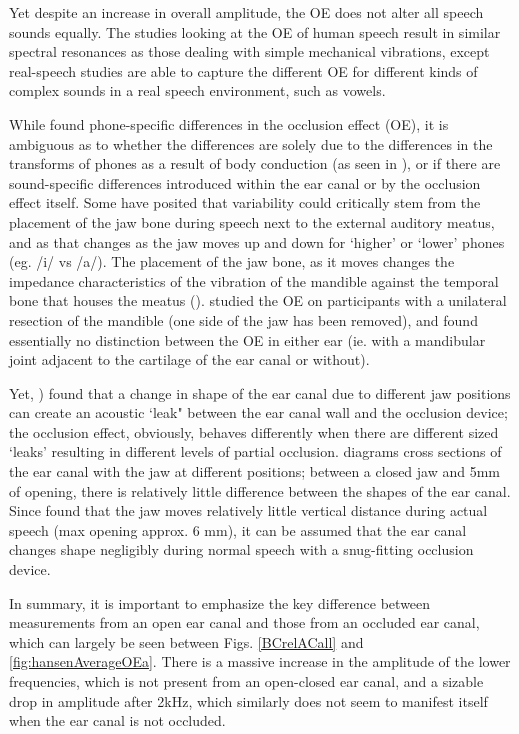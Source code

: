 Yet despite an increase in overall amplitude, the OE does not alter all speech sounds equally.  The studies looking at the OE of human speech result in similar spectral resonances as those dealing with simple mechanical vibrations, except real-speech studies are able to capture the different OE for different kinds of complex sounds in a real speech environment, such as vowels.  



While \cite{hansen:97b} found phone-specific differences in the occlusion effect (OE), it is ambiguous as to whether the differences are solely due to the differences in the transforms of phones as a result of body conduction (as seen in \cite{reinfeldt:10}), or if there are sound-specific differences introduced within the ear canal or by the occlusion effect itself.  
Some have posited that variability could critically stem from the placement of the jaw bone during speech next to the external auditory meatus, and as that changes as the jaw moves up and down for `higher' or `lower' phones (eg. /i/ vs /a/). The placement of the jaw bone, as it moves changes the impedance characteristics of the vibration of the mandible against the temporal bone that houses the meatus (\cite{bekesy:60}).  \cite{allen:60} studied the OE on participants with a unilateral resection of the mandible (one side of the jaw has been removed), and found essentially no distinction between the OE in either ear (ie. with a mandibular joint adjacent to the cartilage of the ear canal or without).

Yet, \cite{hansen:97b}) found that a change in shape of the ear canal due to different jaw positions can create an acoustic `leak" between the ear canal wall and the occlusion device; the occlusion effect, obviously, behaves differently when there are different sized `leaks' resulting in different levels of partial occlusion. 
\cite{hansen:97b} diagrams cross sections of the ear canal with the jaw at different positions; between a closed jaw and 5mm of opening, there is relatively little difference between the shapes of the ear canal.  Since \cite{borghese:97} found that the jaw moves relatively little vertical distance during actual speech (max opening approx. 6 mm), it can be assumed that the ear canal changes shape negligibly during normal speech with a snug-fitting occlusion device. 

In summary, it is important to emphasize the key difference between measurements from an open ear canal and those from an occluded ear canal, which can largely be seen between Figs. \ref{BCrelACall} and \ref{fig:hansenAverageOEa}.  There is a massive increase in the amplitude of the lower frequencies, which is not present from an open-closed ear canal, and a sizable drop in amplitude after 2kHz, which similarly does not seem to manifest itself when the ear canal is not occluded.


